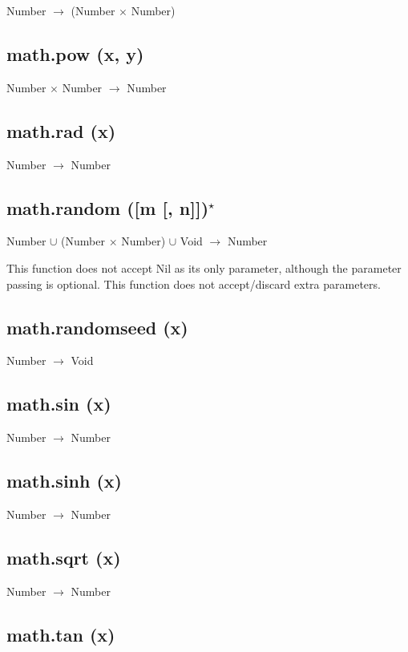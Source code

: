 \documentclass[12pt]{article}
\begin{document}
Number $\rightarrow$ (Number $\times$ Number)

\subsection{math.pow (x, y)}

Number $\times$ Number $\rightarrow$ Number

\subsection{math.rad (x)}

Number $\rightarrow$ Number

\subsection{math.random ([m [, n]])$^\star$}

Number $\cup$ (Number $\times$ Number) $\cup$ Void $\rightarrow$
Number

This function does not accept Nil as its only parameter,
although the parameter passing is optional.
This function does not accept/discard extra parameters.

\subsection{math.randomseed (x)}

Number $\rightarrow$ Void

\subsection{math.sin (x)}

Number $\rightarrow$ Number

\subsection{math.sinh (x)}

Number $\rightarrow$ Number

\subsection{math.sqrt (x)}

Number $\rightarrow$ Number

\subsection{math.tan (x)}
\end{document}
